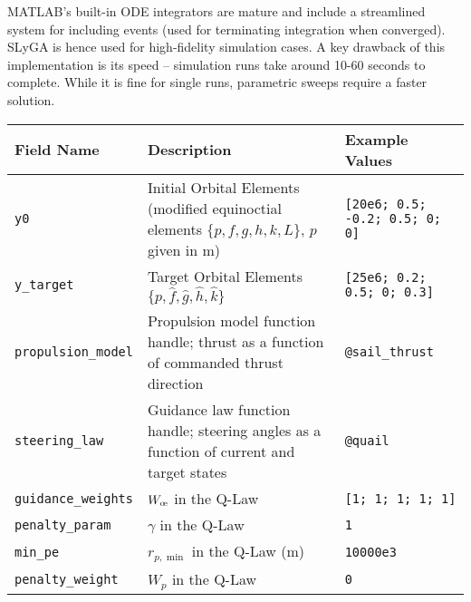 MATLAB's built-in ODE integrators are mature and include a streamlined system for including events (used for terminating integration when converged). SLyGA is hence used for high-fidelity simulation cases. A key drawback of this implementation is its speed -- simulation runs take around 10-60 seconds to complete. While it is fine for single runs, parametric sweeps require a faster solution.

\begin{table}[H]
  \renewcommand{\arraystretch}{1.1}
  \begin{tabular}{lL{5.7cm}l}
    \toprule
    \textbf{Field Name}     & \textbf{Description}                                                                                                            & \textbf{Example Values}             \\
    \midrule
    \verb|y0|               & Initial Orbital Elements (modified equinoctial elements \(\{p, f, g, h, k, L\}\), $p$ given in \unit{m})                        & \verb|[20e6; 0.5; -0.2; 0.5; 0; 0]| \\
    \verb|y_target|         & Target Orbital Elements \(\{\hat{p}, \hat{f}, \hat{g}, \hat{h}, \hat{k}\}\)                                                     & \verb|[25e6; 0.2; 0.5; 0; 0.3]|     \\
    \verb|propulsion_model| & Propulsion model function handle; thrust as a function of commanded thrust direction                                            & \verb|@sail_thrust|                 \\
    \verb|steering_law|     & Guidance law function handle; steering angles as a function of current and target states                                        & \verb|@quail|                       \\
    \verb|guidance_weights| & \(W_\moe\) in the Q-Law                                                                                                         & \verb|[1; 1; 1; 1; 1]|              \\
    \verb|penalty_param|    & \(\gamma\) in the Q-Law                                                                                                         & \verb|1|                            \\
    \verb|min_pe|           & \(r_{p, \min}\) in the Q-Law (\unit{m})                                                                                         & \verb|10000e3|                      \\
    \verb|penalty_weight|   & \(W_p\) in the Q-Law                                                                                                            & \verb|0|                            \\

\end{tabular}
\end{table}
